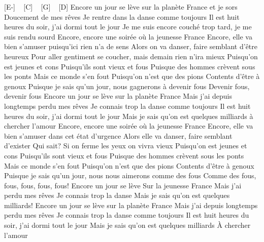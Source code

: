 [E-] ~ [C] ~ [G] ~ [D]
Encore un jour se lève sur la planète France et je sors
Doucement de mes rêves
Je rentre dans la danse comme toujours
Il est huit heures du soir, j'ai dormi tout le jour
Je me suis encore couché trop tard, je me suis rendu sourd
Encore, encore une soirée où la jeunesse France
Encore, elle va bien s'amuser puisqu'ici rien n'a de sens
Alors on va danser, faire semblant d'être heureux
Pour aller gentiment se coucher, mais demain rien n'ira mieux
Puisqu'on est jeunes et cons
Puisqu'ils sont vieux et fous
Puisque des hommes crèvent sous les ponts
Mais ce monde s'en fout
Puisqu'on n'est que des pions
Contents d'être à genoux
Puisque je sais qu'un jour, nous gagnerons à devenir fous
Devenir fous, devenir fous
Encore un jour se lève sur la planète France
Mais j'ai depuis longtemps perdu mes rêves
Je connais trop la danse comme toujours
Il est huit heures du soir, j'ai dormi tout le jour
Mais je sais qu'on est quelques milliards à chercher l'amour
Encore, encore une soirée où la jeunesse France
Encore, elle va bien s'amuser dans cet état d'urgence
Alors elle va danser, faire semblant d'exister
Qui sait? Si on ferme les yeux on vivra vieux
Puisqu'on est jeunes et cons
Puisqu'ils sont vieux et fous
Puisque des hommes crèvent sous les ponts
Mais ce monde s'en fout
Puisqu'on n'est que des pions
Contents d'être à genoux
Puisque je sais qu'un jour, nous nous aimerons comme des fous
Comme des fous, fous, fous, fous, fous!
Encore un jour se lève
Sur la jeunesse France
Mais j'ai perdu mes rêves
Je connais trop la danse
Mais je sais qu'on est quelques milliards!
Encore un jour se lève sur la planète France
Mais j'ai depuis longtemps perdu mes rêves
Je connais trop la danse comme toujours
Il est huit heures du soir, j'ai dormi tout le jour
Mais je sais qu'on est quelques milliards
À chercher l'amour